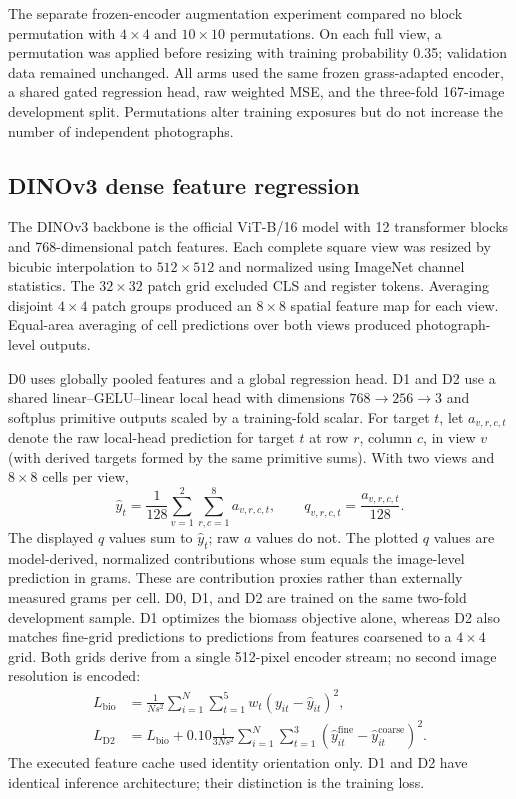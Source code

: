 \documentclass[pdflatex,a4paper,sn-nature]{sn-jnl}
\begin{document}
The separate frozen-encoder augmentation experiment compared no block permutation with $4\times4$ and $10\times10$ permutations. On each full view, a permutation was applied before resizing with training probability 0.35; validation data remained unchanged. All arms used the same frozen grass-adapted encoder, a shared gated regression head, raw weighted MSE, and the three-fold 167-image development split. Permutations alter training exposures but do not increase the number of independent photographs.

\subsection{DINOv3 dense feature regression}
The DINOv3 backbone is the official ViT-B/16 model with 12 transformer blocks and 768-dimensional patch features. Each complete square view was resized by bicubic interpolation to $512\times512$ and normalized using ImageNet channel statistics. The $32\times32$ patch grid excluded CLS and register tokens. Averaging disjoint $4\times4$ patch groups produced an $8\times8$ spatial feature map for each view. Equal-area averaging of cell predictions over both views produced photograph-level outputs.

D0 uses globally pooled features and a global regression head. D1 and D2 use a shared linear--GELU--linear local head with dimensions $768\to256\to3$ and softplus primitive outputs scaled by a training-fold scalar. For target $t$, let $a_{v,r,c,t}$ denote the raw local-head prediction for target $t$ at row $r$, column $c$, in view $v$ (with derived targets formed by the same primitive sums). With two views and $8\times8$ cells per view,
\begin{equation}
\hat y_t=\frac{1}{128}\sum_{v=1}^{2}\sum_{r,c=1}^{8}a_{v,r,c,t},\qquad q_{v,r,c,t}=\frac{a_{v,r,c,t}}{128}.
\end{equation}
The displayed $q$ values sum to $\hat y_t$; raw $a$ values do not. The plotted $q$ values are model-derived, normalized contributions whose sum equals the image-level prediction in grams. These are contribution proxies rather than externally measured grams per cell. D0, D1, and D2 are trained on the same two-fold development sample. D1 optimizes the biomass objective alone, whereas D2 also matches fine-grid predictions to predictions from features coarsened to a $4\times4$ grid. Both grids derive from a single 512-pixel encoder stream; no second image resolution is encoded:
\begin{align}
L_{\mathrm{bio}}&=\frac{1}{Ns^2}\sum_{i=1}^{N}\sum_{t=1}^{5}w_t(y_{it}-\hat y_{it})^2,\\
L_{\mathrm{D2}}&=L_{\mathrm{bio}}+0.10\frac{1}{3Ns^2}\sum_{i=1}^{N}\sum_{t=1}^{3}(\hat y^{\mathrm{fine}}_{it}-\hat y^{\mathrm{coarse}}_{it})^2.
\end{align}
The executed feature cache used identity orientation only. D1 and D2 have identical inference architecture; their distinction is the training loss.
\end{document}
